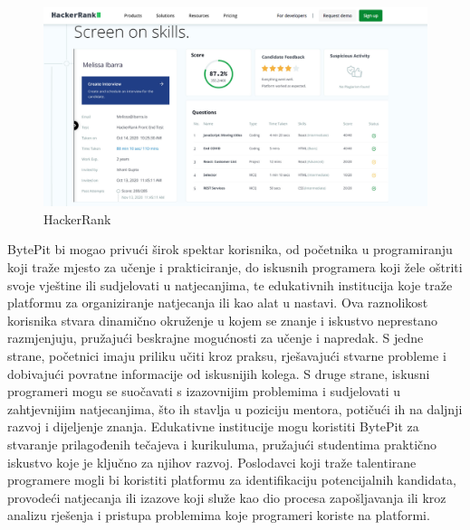 \begin{packed_item}
			\begin{figure}[H]
				\includegraphics[scale=0.4]{slike/hackerrank.PNG}
				\centering
				\caption{HackerRank}
				\label{fig:hackerrank}
			\end{figure}
		\end{packed_item}
		
		\eject


		BytePit bi mogao privući širok spektar korisnika, od početnika u programiranju 
		koji traže mjesto za učenje i prakticiranje, do iskusnih programera koji žele 
		oštriti svoje vještine ili sudjelovati u natjecanjima, te edukativnih institucija 
		koje traže platformu za organiziranje natjecanja ili kao alat u nastavi. Ova 
		raznolikost korisnika stvara dinamično okruženje u kojem se znanje i iskustvo 
		neprestano razmjenjuju, pružajući beskrajne mogućnosti za učenje i napredak. 
		S jedne strane, početnici imaju priliku učiti kroz praksu, rješavajući stvarne 
		probleme i dobivajući povratne informacije od iskusnijih kolega. S druge strane, 
		iskusni programeri mogu se suočavati s izazovnijim problemima i sudjelovati u 
		zahtjevnijim natjecanjima, što ih stavlja u poziciju mentora, potičući ih na 
		daljnji razvoj i dijeljenje znanja. Edukativne institucije mogu koristiti BytePit 
		za stvaranje prilagođenih tečajeva i kurikuluma, pružajući studentima praktično 
		iskustvo koje je ključno za njihov razvoj. Poslodavci koji traže talentirane 
		programere mogli bi koristiti platformu za identifikaciju potencijalnih kandidata, 
		provodeći natjecanja ili izazove koji služe kao dio procesa zapošljavanja ili kroz 
		analizu rješenja i pristupa problemima koje programeri koriste na platformi.
		\\

